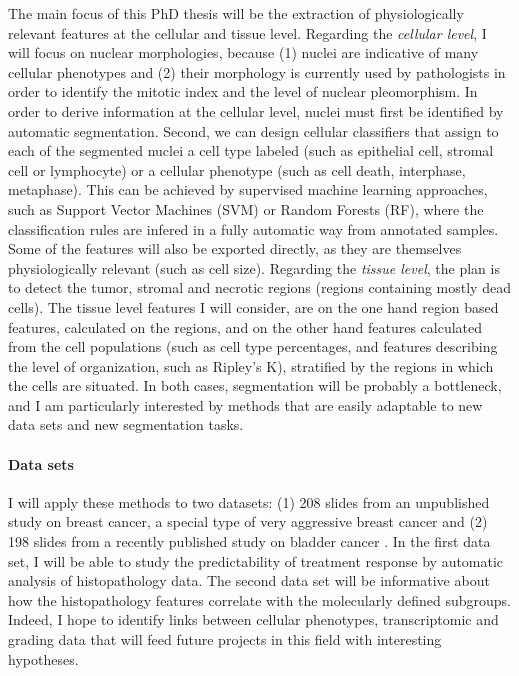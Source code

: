 \documentclass[a4paper,10pt,twocolumn]{article}
\begin{document}
The main focus of this PhD thesis will be the extraction of
physiologically relevant features at the cellular and tissue
level. Regarding the {\em cellular level}, I will focus on nuclear morphologies,
because (1) nuclei are indicative of many cellular
phenotypes\citep{Chow2012} and (2) their morphology is currently used by
pathologists in order to identify the mitotic index and the level of
nuclear pleomorphism\citep{Elston1991}. In order to derive information
at the cellular level, nuclei must first be identified by automatic
segmentation. Second, we can design cellular classifiers that assign
to each of the segmented nuclei a cell type labeled (such as
epithelial cell, stromal cell or 
lymphocyte) or a cellular phenotype (such as cell death, interphase,
metaphase). This can be achieved by supervised machine learning approaches,
such as Support Vector Machines (SVM) or Random Forests (RF), 
where the classification rules are infered in a fully automatic way from
annotated samples. Some of the features will also be exported directly, as they
are themselves physiologically relevant (such as cell size). 
Regarding the {\em tissue level}, the plan is to detect the tumor,
stromal and necrotic regions (regions containing mostly dead
cells). The tissue level features I will consider, are on the one hand
region based features, calculated on the regions, and on the other
hand features calculated from the cell populations (such as cell type
percentages, and features describing the level of organization, such
as Ripley's K), stratified by the regions in which the cells are situated. 
In both cases, segmentation will be probably a bottleneck, and I am
particularly interested by methods that are easily adaptable to new
data sets and new segmentation tasks.

\paragraph{Data sets}

I will apply these methods to
two datasets: (1) 208 slides from an unpublished study on breast
cancer, a special type of very aggressive breast cancer  and (2) 198
slides from a recently published study on bladder cancer
\citep{biton2014independent}. In the first data set, I will be able to
study the predictability of treatment response by automatic
analysis of histopathology data. The second data set will be
informative about how the histopathology features correlate with the
molecularly defined subgroups. Indeed, I hope to identify links between
cellular phenotypes, transcriptomic and grading data that will feed
future projects in this field with interesting hypotheses. 
\end{document}
